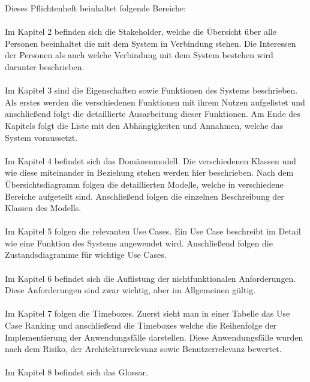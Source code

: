 \documentclass[../../Pflichtenheft.tex]{subfiles}
\begin{document}
	Dieses Pflichtenheft beinhaltet folgende Bereiche: \\ \\
	Im Kapitel 2 befinden sich die Stakeholder, welche die Übersicht über
	alle Personen beeinhaltet die mit dem System in Verbindung stehen.
	Die Interessen der Personen als auch welche Verbindung mit dem System
	bestehen wird darunter beschrieben. \\ \\
	Im Kapitel 3 sind die Eigenschaften sowie Funktionen des Systems beschrieben.
	Als erstes werden die verschiedenen Funktionen mit ihrem Nutzen aufgelistet und
	anschließend folgt die detaillierte Ausarbeitung dieser Funktionen.
	Am Ende des Kapitels folgt die Liste mit den Abhängigkeiten und Annahmen, welche
	das System voraussetzt. \\ \\
	Im Kapitel 4 befindet sich das Domänenmodell. Die verschiedenen Klassen und wie
	diese miteinander in Beziehung stehen werden hier beschrieben. 
	Nach dem Übersichtsdiagramm folgen die detaillierten Modelle, welche in
	verschiedene Bereiche aufgeteilt sind.
	Anschließend folgen die einzelnen Beschreibung der Klassen des Modells. \\ \\
	Im Kapitel 5 folgen die relevanten Use Cases. Ein Use Case beschreibt im Detail
	wie eine Funktion des Systems angewendet wird. Anschließend folgen die
	Zustandsdiagramme für wichtige Use Cases. \\ \\
	Im Kapitel 6 befindet sich die Auflistung der nichtfunktionalen Anforderungen.
	Diese Anforderungen sind zwar wichtig, aber im Allgemeinen gültig. \\ \\
	Im Kapitel 7 folgen die Timeboxes. Zuerst sieht man in einer Tabelle das Use Case
	Ranking und anschließend die Timeboxes welche die Reihenfolge der Implementierung
	der Anwendungsfälle darstellen. Diese Anwendungsfälle wurden nach dem Risiko, der
	Architekturrelevanz sowie Benutzerrelevanz bewertet.\\ \\
	Im Kapitel 8 befindet sich das Glossar.
\end{document}
